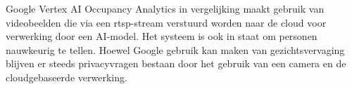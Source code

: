 Google Vertex AI Occupancy Analytics in vergelijking maakt gebruik van videobeelden die via een \gls{rtsp}-stream verstuurd worden naar de cloud voor verwerking door een AI-model. Het systeem is ook in staat om personen nauwkeurig te tellen. Hoewel Google gebruik kan maken van gezichtsvervaging blijven er steeds privacyvragen bestaan door het gebruik van een camera en de cloudgebaseerde verwerking. \\








